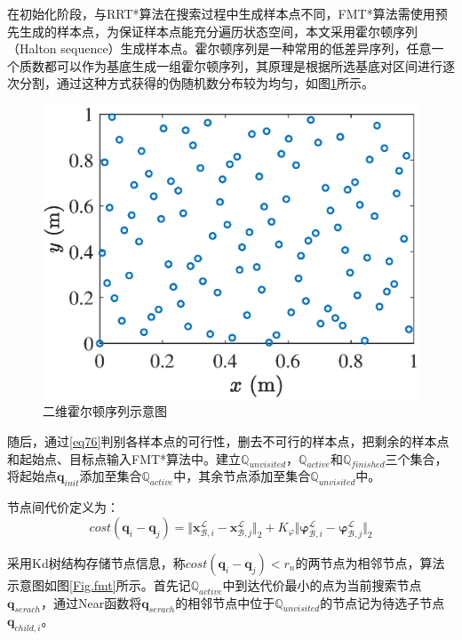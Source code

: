 \documentclass[lang=chs, degree=master, blindreview=false, winfonts=true]{yanputhesis}
\begin{document}
在初始化阶段，与RRT*算法在搜索过程中生成样本点不同，FMT*算法需使用预先生成的样本点，为保证样本点能充分遍历状态空间，本文采用霍尔顿序列（Halton sequence）生成样本点。霍尔顿序列是一种常用的低差异序列，任意一个质数都可以作为基底生成一组霍尔顿序列，其原理是根据所选基底对区间进行逐次分割，通过这种方式获得的伪随机数分布较为均匀，如图\ref{fig-halton}所示。

\begin{figure}[htbp]
	\centering
	\includegraphics[width=2.8 in]{picture/haltonset.eps}
	\caption{二维霍尔顿序列示意图}
	\label{fig-halton}
\end{figure}

随后，通过\autoref{eq76}判别各样本点的可行性，删去不可行的样本点，把剩余的样本点和起始点、目标点输入FMT*算法中。建立$\mathbb{Q}_{unvisited}$，$\mathbb{Q}_{active}$和$\mathbb{Q}_{finished}$三个集合，将起始点$\boldsymbol{q}_{init}$添加至集合$\mathbb{Q}_{active}$中，其余节点添加至集合$\mathbb{Q}_{unvisited}$中。

节点间代价定义为：
\begin{equation}
	cost(\boldsymbol{q}_{i}-\boldsymbol{q}_{j}) =\Vert {\boldsymbol{x}}_{\mathcal{B},i}^{\mathcal{L}}-{\boldsymbol{x}}_{\mathcal{B},j}^{\mathcal{L}}\Vert_2+K_{\varphi}\Vert \boldsymbol{\varphi}_{\mathcal{B},i}^{\mathcal{L}}-\boldsymbol{\varphi}_{\mathcal{B},j}^{\mathcal{L}}\Vert_2
\end{equation}

采用Kd树结构存储节点信息，称$cost(\boldsymbol{q}_{i}-\boldsymbol{q}_{j})<r_{n}$的两节点为相邻节点，算法示意图如图\ref{Fig.fmt}所示。首先记$\mathbb{Q}_{active}$中到达代价最小的点为当前搜索节点$\boldsymbol{q}_{serach}$，通过Near函数将$\boldsymbol{q}_{serach}$的相邻节点中位于$\mathbb{Q}_{unvisited}$的节点记为待选子节点$\boldsymbol{q}_{child,i}$。
\end{document}
